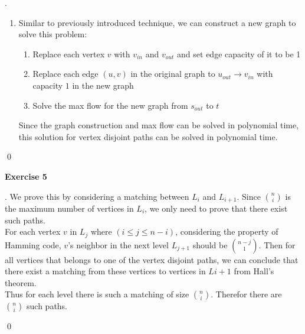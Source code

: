 \documentclass[12pt, notitlepage]{article}
\newenvironment{sol}
  {\par\vspace{3mm}\noindent{\it Solution}.}{\qed}
\begin{document}
\begin{sol}
\begin{enumerate}[1.]
\begin{figure}
\begin{subfigure}{.5\textwidth}
				\caption{converted edge capacity graph}
			\end{subfigure}
		\end{figure}
	\item Similar to previously introduced technique, we can construct a new graph to solve this problem:
		\begin{enumerate}[(1)]
			\item Replace each vertex $v$ with $v_{in}$ and $v_{out}$ and set edge capacity of it to be 1
			\item Replace each edge $(u, v)$ in the original graph to $u_{out}\rightarrow v_{in}$ with capacity $1$ in the new graph
			\item Solve the max flow for the new graph from $s_{out}$ to $t$
		\end{enumerate}
		Since the graph construction and max flow can be solved in polynomial time, this solution for vertex disjoint paths can be solved in polynomial time.
	\end{enumerate}
\end{sol}


\textbf{Exercise 5}
\begin{sol}
	We prove this by considering a matching between $L_i$ and $L_{i+1}$. Since $\binom{n}{i}$ is the maximum number of vertices in $L_i$, we only need to prove that there exist such paths.\\
	For each vertex $v$ in $L_{j}$ where $(i\leq j\leq n-i)$, considering the property of Hamming code, $v$'s neighbor in the next level $L_{j+1}$ should be $\binom{n-j}{1}$. Then for all vertices that belongs to one of the vertex disjoint paths, we can conclude that there exist a matching from these vertices to vertices in $L{i+1}$ from Hall's theorem.\\
	Thus for each level there is such a matching of size $\binom{n}{i}$. Therefor there are $\binom{n}{i}$ such paths.

\end{sol}
\end{document}
